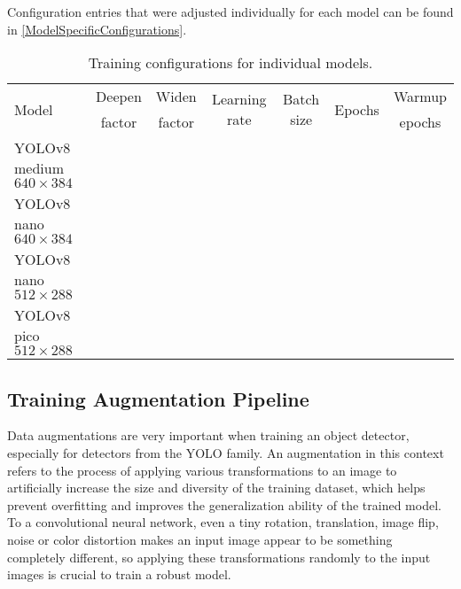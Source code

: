 Configuration entries that were adjusted individually for each model can be
found in \autoref{ModelSpecificConfigurations}.

\begin{table}[h]
\centering
\label{ModelSpecificConfigurations}
\small
\begin{tabular}{|p{3cm}|c|c|c|c|c|c|}
    \hline
    \multirow{2}{*}{Model} & Deepen & Widen & \multirow{2}{*}{Learning rate} & \multirow{2}{*}{Batch size} & \multirow{2}{*}{Epochs} & Warmup \\
    & factor & factor & & & & epochs \\
    \hline
    YOLOv8 medium \newline $640 \times 384$ & & & & & & \\
    \hline
    YOLOv8 nano \newline $640 \times 384$   & & & & & & \\
    \hline
    YOLOv8 nano \newline $512 \times 288$   & & & & & & \\
    \hline
    YOLOv8 pico \newline $512 \times 288$   & & & & & & \\
    \hline
\end{tabular}
\caption{Training configurations for individual models.}
\end{table}


\subsection{Training Augmentation Pipeline}

Data augmentations are very important when training an object detector,
especially for detectors from the YOLO family. An augmentation in this context
refers to the process of applying various transformations to an image to
artificially increase the size and diversity of the training dataset, which
helps prevent overfitting and improves the generalization ability of the trained
model. To a convolutional neural network, even a tiny rotation, translation,
image flip, noise or color distortion makes an input image appear to be
something completely different, so applying these transformations randomly to
the input images is crucial to train a robust model.


